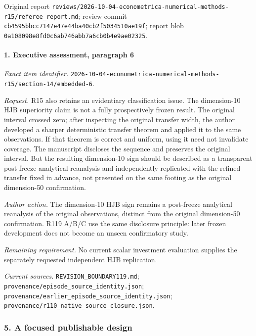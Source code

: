 Original report \nolinkurl{reviews/2026-10-04-econometrica-numerical-methods-r15/referee_report.md}; review commit \nolinkurl{cb4595bbcc7147e47e44ba40cb2f5034510ae19f}; report blob \nolinkurl{0a108098e8fd0c6ab746abb7a6cb0b4e9ae02325}.

\paragraph{1. Executive assessment, paragraph 6}

\emph{Exact item identifier.} \nolinkurl{2026-10-04-econometrica-numerical-methods-r15/section-14/embedded-6}.

\par\emph{Request.} R15 also retains an evidentiary classification issue. The dimension-10 HJB superiority claim is not a fully prospectively frozen result. The original interval crossed zero; after inspecting the original transfer width, the author developed a sharper deterministic transfer theorem and applied it to the same observations. If that theorem is correct and uniform, using it need not invalidate coverage. The manuscript discloses the sequence and preserves the original interval. But the resulting dimension-10 sign should be described as a transparent post-freeze analytical reanalysis and independently replicated with the refined transfer fixed in advance, not presented on the same footing as the original dimension-50 confirmation.

\par\emph{Author action.} The dimension-10 HJB sign remains a post-freeze analytical reanalysis of the original observations, distinct from the original dimension-50 confirmation. R119 A/\allowbreak{}B/\allowbreak{}C use the same disclosure principle: later frozen development does not become an unseen confirmatory study.

\par\emph{Remaining requirement.} No current scalar investment evaluation supplies the separately requested independent HJB replication.

\par\emph{Current sources.} \nolinkurl{REVISION_BOUNDARY119.md}; \nolinkurl{provenance/episode_source_identity.json}; \nolinkurl{provenance/earlier_episode_source_identity.json}; \nolinkurl{provenance/r110_native_source_closure.json}.

\subsubsection{5. A focused publishable design}

